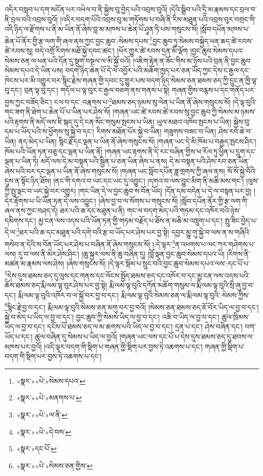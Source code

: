 འདིར་བསླབ་པ་དག་མངོན་པར་འཕེལ་བ་ནི་སྐྱེས་བུ་བྱེད་པའི་འབྲས་བུའོ། །དེའི་སྒྲིབ་པའི་དྲི་མ་རྣམས་དང་བྲལ་བ་ནི་བྲལ་བའི་འབྲས་བུའོ། །འདིར་བདག་པོའི་འབྲས་བུ་མ་གཏོགས་པ་བཞི་ནི་རིས་མཐུན་པའི་འབྲས་བུར་བགྲང་གི་འདི་ཉིད་ལ་རྫོགས་པ་ནི་མ་ཡིན་ནོ་ཞེས་བླ་མ་མཁས་པ་ཆེན་པོ་ཤཱན་ཏི་པས་གསུངས་སོ། །སློབ་དཔོན་མཁས་པ་ཆེན་པོ་ནོར་གྱི་རྩ་ལག་གི་ཞལ་ནས་ཀྱང་བྱང་ཆུབ་:སེམས་དཔས་\footnote{«སྣར་»«པེ་»སེམས་དཔའ་}བྱང་ཆུབ་ཏུ་སེམས་བསྐྱེད་ཕན་ཆད་ཚེ་རབས་ཚེ་རབས་སུ། བདེ་འགྲོ་རིགས་མཐོ་སྐྱེ་དབང་ཚང་། །ཕོར་གྱུར་ཚེ་རབས་དྲན་མི་ལྡོག །བྱང་ཆུབ་སེམས་དཔའ་སེམས་ཅན་ལ་ཕན་པའི་དོན་དུ་སྡུག་བསྔལ་ལ་མི་སྐྱོ་བའོ། །འཇིག་རྟེན་ན་ཟོང་གིས་མ་ཉོས་པའི་བྲན་ནི་བྱང་ཆུབ་སེམས་དཔའ་དེ་ཡིན་པས། བདག་ཉིད་ཆེན་པོ་དེ་ལ་འབྱོར་པའི་མཆོག་ཁྱད་པར་ཅན་ཡོད་ཀྱང་དེས་ང་རྒྱལ་དང་ཁེངས་པར་མི་འགྱུར་བར་སྙིང་རྗེས་གཞན་གྱི་དབང་དུ་གྱུར་པས་བདག་ཉིད་སེམས་ཅན་ཐམས་ཅད་ཀྱི་དྲུང་ན་ཁྱི་ལྟ་བུ་དང་། བྲན་ལྟ་བུ་དང་། གདོལ་པ་ལྟ་བུར་ང་རྒྱལ་བཅག་ནས་གནས་པ་སྟེ། གཞན་གྱིས་བརྙས་པ་དང་གནོད་པར་བྱས་ཀྱང་བཟོད་ཅིང་། ངལ་བ་དང་:བརྣགས་པ་\footnote{«སྣར་»«པེ་»མནགས་པ་}ཐམས་ཅད་ཉམས་སུ་ལེན་པ་ཡིན་ནོ་ཞེས་གསུངས་སོ། །དེ་ལྟ་བུའི་གང་ཟག་ནི་ཐེག་པ་ཆེན་པོ་པ་ཡིན་པར་ཤེས་སོ། །གཞན་ཡང་ཚེ་རབས་ཚེ་རབས་སུ་བྱང་ཆུབ་ཀྱི་སེམས་མ་ཉམས་པའི་རྟགས་ནི་མདོ་ལས་ཇི་སྐད་དུ་དེ་ངན་སོང་གསུམ་སྤངས་པ་ཡིན། ཡུལ་མཐའ་འཁོབ་སྤངས་པ་ཡིན། སྐྱེས་བུ་དམ་པ་ཡོད་པའི་ས་ཕྱོགས་སུ་སྐྱེ་བ་དང་། རིགས་མཐོན་པོར་སྐྱེ་བ་ཡིན། གཟུགས་བཟང་བ་ཡིན། ཤེས་རབ་ཆེ་བ་ཡིན། ནད་མེད་པ་ཡིན། སྙིང་རྗེ་དང་ལྡན་པ་ཡིན་ནོ་ཞེས་གསུངས་སོ། །གཞན་ཡང་དེ་མི་ཁོམ་པ་བརྒྱད་སྤངས་ཤིང་། ཁོམ་པའི་ཡོན་ཏན་བཅུ་དང་ལྡན་པ་ཡིན་ནོ། །གཞན་ཡང་རྟགས་ནི་དེ་རང་བཞིན་གྱིས་ཕ་རོལ་ཏུ་ཕྱིན་པ་དྲུག་དང་ལྡན་པ་ཡིན་ཏེ། མདོ་ལས་དེ་མ་བསྟན་པའི་སྦྱིན་པ་ཅན་ཡིན་ཞེས་པ་ནས། དེ་མ་བསྟན་པའི་ཤེས་རབ་ཅན་ཡིན་ཞེས་པའི་བར་དང་ལྡན་པ་ཡིན་ནོ་ཞེས་གསུངས་སོ། །གཞན་ཡང་སློབ་དཔོན་ཟླ་གྲགས་ཀྱི་ཞལ་ནས། སོ་སོ་སྐྱེ་བོའི་དུས་ན་སྟོང་ཉིད་ཐོས། །ནང་གི་དགའ་བ་ཡང་དང་ཡང་དུ་འབྱུང་། །དགའ་བ་ལས་བྱུང་མིག་ནི་མཆི་མས་གང་། །ལུས་ཀྱི་སྤུ་ལྡང་བ་ཡང་སྐྱེ་བར་འགྱུར། །གང་ཡིན་དེ་ལ་བྱང་ཆུབ་ས་བོན་ཡོད། །དོན་དམ་བདེན་པ་དེ་ལ་བསྟན་པར་བྱ། །དེར་རྟོགས་པ་ཡི་ཡོན་ཏན་དེ་ལས་འབྱུང་། །ཞེས་བྱ་བ་ལ་སོགས་པ་གསུངས་སོ། །སློབ་དཔོན་ནོར་གྱི་རྩ་ལག་གི་ཞལ་ནས་ཀྱང་བཤད་དེ། ཐར་པའི་ཆ་དང་མཐུན་པ་ནི། གང་ལ་བདག་མེད་པའི་གཏམ་དང་འཁོར་བའི་ཉེས་དམིགས་དང་། མྱ་ངན་ལས་འདས་པའི་ཡོན་ཏན་གྱི་གཏམ་བརྗོད་པ་ཐོས་ན་མཆི་མ་འཁྲུག་པ་དང་། སྤུ་ཟིང་བྱེད་པ་དེ་ལ་\footnote{«སྣར་»«པེ་»ལ་ནི་}ཐར་པའི་ཆ་དང་མཐུན་པའི་དགེ་བའི་རྩ་བ་ཡོད་པར་ཤེས་པར་བྱ་སྟེ། དབྱར་མྱུ་གུ་སྐྱེ་བ་ལས་ན་ས་གཞིའི་གསེབ་ན་དེའི་ས་བོན་ཡོད་པར་ཤེས་པ་བཞིན་ནོ་ཞེས་གསུངས་སོ། །:དེ་ལྟར་\footnote{«སྣར་»«པེ་»དེ་བས་}ན་འཕགས་པ་ལང་ཀར་གཤེགས་པ་ལས། དུ་བ་ལས་ནི་མེར་ཤེས་ཤིང་། །ཆུ་སྐྱར་ལས་ནི་ཆུ་བཞིན་དུ། །བློ་ལྡན་བྱང་ཆུབ་སེམས་དཔའ་ཡི། །རིགས་ནི་མཚན་མ་རྣམས་ལས་ཤེས། །ཞེས་གསུངས་སོ། །དེ་ལྟར་སྡོམ་པ་སྲུང་བའི་བྱང་ཆུབ་སེམས་དཔའ་ལས་:དང་པོ་པ་\footnote{«སྣར་»དང་པོ་}དེས་དུས་ཐམས་ཅད་དུ་ལུས་དང་གནས་དང་ལོངས་སྤྱོད་ཐམས་ཅད་དང་འཁོར་བ་དང་མྱ་ངན་ལས་འདས་པའི་ཆོས་ཐམས་ཅད་རྨི་ལམ་ལྟ་བུར་ཤེས་པར་བྱ་སྟེ། རྨི་ལམ་ལྟ་བུའི་དཀོན་མཆོག་གསུམ་ལ་རྨི་ལམ་ལྟ་བུའི་སྲི་ཞུ་བྱ་བ་དང་། རྨི་ལམ་ལྟ་བུའི་འཁོར་བ་ལ་སྐྱོ་བར་བྱ་བ་དང་། རྨི་ལམ་ལྟ་བུའི་སེམས་ཅན་ལ་རྨི་ལམ་ལྟ་བུའི་:སེམས་ཀྱིས་\footnote{«སྣར་»«པེ་»སེམས་ཅན་གྱིས་}སྙིང་རྗེ་བྱ་བ་དང་། རྨི་ལམ་ལྟ་བུའི་སེམས་ཅན་མགུ་བར་བྱ་བའོ། །སེམས་ཅན་ཐམས་ཅད་ཇོ་བོར་ཡིད་ལ་བྱ་བ་དང་། སྐྱེ་བ་མེད་པ་ཡིད་ལ་བྱ་བ་དང་། བྱང་ཆུབ་ཀྱི་སེམས་ཡིད་ལ་བྱ་བ་དང་། འཆི་བ་ཡིད་ལ་བྱ་བ་དང་། ཚུལ་ཁྲིམས་ཡིད་ལ་བྱ་བ་དང་། དངོས་པོ་ཐམས་ཅད་ལ་མ་ཆགས་པའི་ཡིད་ལ་བྱ་བ་དང་། དྲན་པ་དང་། ཤེས་བཞིན་དང་། བག་ཡོད་པ་དང་། ཚུལ་བཞིན་དུ་སེམས་པ་ཡིད་ལ་བྱའོ། །གཞན་ཡང་ལས་དང་པོ་པ་དེས་དུས་ཐམས་ཅད་དུ་ཐབས་ལ་མཁས་པར་བྱའོ། །འདི་ལྟར་བདག་གི་སྡིག་པ་གཞན་གྱི་སྡིག་པར་བྱས་ཏེ་འཆགས་པ་དང་། གཞན་གྱི་སྡིག་པ་བདག་གི་སྡིག་པར་བྱས་ཏེ་འཆགས་པ་དང་། 